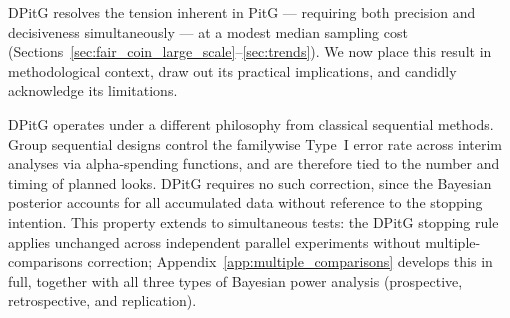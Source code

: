 DPitG resolves the tension inherent in PitG --- requiring both precision and
decisiveness simultaneously --- at a modest median sampling cost
(Sections~\ref{sec:fair_coin_large_scale}--\ref{sec:trends}).
We now place this result in methodological context, draw out its practical
implications, and candidly acknowledge its limitations.

DPitG operates under a different philosophy from classical sequential methods.
Group sequential designs \citep{jennison2000} control the familywise Type~I error rate
across interim analyses via alpha-spending functions, and are therefore tied to the
number and timing of planned looks.
DPitG requires no such correction, since the Bayesian posterior accounts for all
accumulated data without reference to the stopping intention.
This property extends to simultaneous tests: the DPitG stopping rule applies
unchanged across independent parallel experiments without multiple-comparisons
correction; Appendix~\ref{app:multiple_comparisons} develops this in full,
together with all three types of Bayesian power analysis (prospective,
retrospective, and replication).

